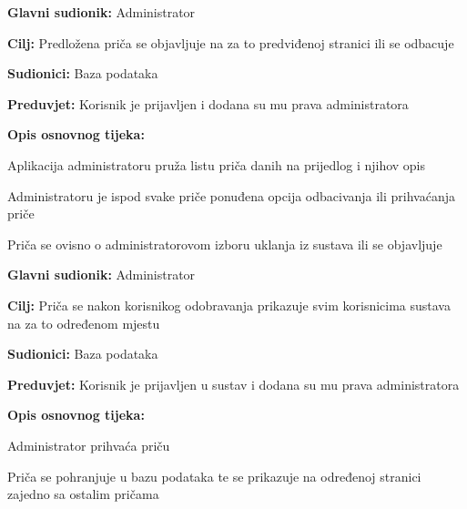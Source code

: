 					\noindent {}
				\begin{packed_item}
					
					\item \textbf{Glavni sudionik: }Administrator
					\item  \textbf{Cilj:} Predložena priča se objavljuje na za to predviđenoj stranici ili se odbacuje
					\item  \textbf{Sudionici:} Baza podataka
					\item  \textbf{Preduvjet:} Korisnik je prijavljen i dodana su mu prava administratora
					\item  \textbf{Opis osnovnog tijeka:}
					
					\item[] \begin{packed_enum}
						
						\item Aplikacija administratoru pruža listu priča danih na prijedlog i njihov opis
						\item Administratoru je ispod svake priče ponuđena opcija odbacivanja ili prihvaćanja priče
						\item Priča se ovisno o administratorovom izboru uklanja iz sustava ili se objavljuje
					\end{packed_enum}
				\end{packed_item}
			
					\noindent \underbar{\textbf{UC8 $-$ Objava priče}}
				\begin{packed_item}
					
					\item \textbf{Glavni sudionik: }Administrator
					\item  \textbf{Cilj:} Priča se nakon korisnikog odobravanja prikazuje svim korisnicima sustava na za to određenom mjestu
					\item  \textbf{Sudionici:} Baza podataka
					\item  \textbf{Preduvjet:} Korisnik je prijavljen u sustav i dodana su mu prava administratora
					\item  \textbf{Opis osnovnog tijeka:}
					
					\item[] \begin{packed_enum}
						
						\item Administrator prihvaća priču
						\item Priča se pohranjuje u bazu podataka te se prikazuje na određenoj stranici zajedno sa ostalim pričama
					\end{packed_enum}
				\end{packed_item}
			
